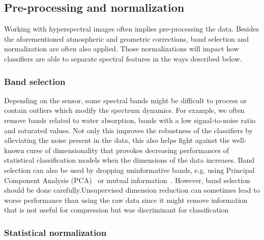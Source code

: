 \documentclass[journal]{IEEEtran}
\begin{document}
\subsection{Pre-processing and normalization}

Working with hyperspectral images often implies pre-processing the data. Besides the aforementioned atmospheric and geometric corrections, band selection and normalization are often also applied. Those normalizations will impact how classifiers are able to separate spectral features in the ways described below.




\subsubsection{Band selection}

Depending on the sensor, some spectral bands might be difficult to process or contain outliers which modify the spectrum dynamics. For example, we often remove bands related to water absorption, bands with a low signal-to-noise ratio and saturated values. Not only this improves the robustness of the classifiers by alleviating the noise present in the data, this also helps fight against the well-known curse of dimensionality that provokes decreasing performances of statistical classification models when the dimensions of the data increases. Band selection can also be used by dropping uninformative bands, e.g. using Principal Component Analysis (PCA)~\cite{farrell_impact_2005} or mutual information~\cite{guo_band_2006}. However, band selection should be done carefully.Unsupervised dimension reduction can sometimes lead to worse performance than using the raw data since it might remove information that is not useful for compression but was discriminant for classification~\cite{du_band_2003}



\subsubsection{Statistical normalization}
\end{document}
